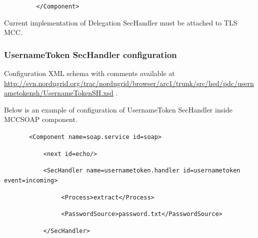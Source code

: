\documentclass{article}
\newcommand\textstyleInternetlink[1]{\textcolor[rgb]{0.0,0.0,0.5019608}{#1}}
\begin{document}
{\upshape\color{black}
\texttt{\ \ \ \ \ \ \ \ \ {\textless}/Component{\textgreater}}}

{\upshape\color{black}
Current implementation of Delegation\textbf{ }SecHandler must be
attached to TLS MCC. }

\subsubsection[UsernameToken SecHandler configuration]{UsernameToken
SecHandler configuration}
\label{bkm:RefSecuserametokenconfig}{\upshape\color{black}
Configuration XML schema with comments available at
\href{http://svn.nordugrid.org/trac/nordugrid/browser/arc1/trunk/src/hed/pdc/usernametokensh/UsernameTokenSH.xsd}{\textstyleInternetlink{http://svn.nordugrid.org/trac/nordugrid/browser/arc1/trunk/src/hed/pdc/usernametokensh/UsernameTo}}\href{http://svn.nordugrid.org/trac/nordugrid/browser/arc1/trunk/src/hed/pdc/usernametokensh/UsernameTokenSH.xsd}{\textstyleInternetlink{kenSH.xsd}}
.}

{\upshape\color{black}
Below is an example of configuration of UsernameToken SecHandler inside
MCCSOAP component.}

{\upshape\color{black}
\texttt{\ \ \ \ \ \ \ {\textless}Component
name={\textquotedbl}soap.service{\textquotedbl}
id={\textquotedbl}soap{\textquotedbl}{\textgreater}}}

{\upshape\color{black}
\texttt{\ \ \ \ \ \ \ \ \ \ \ {\textless}next
id={\textquotedbl}echo{\textquotedbl}/{\textgreater}}}

{\upshape\color{black}
\texttt{\ \ \ \ \ \ \ \ \ \ \ {\textless}SecHandler
name={\textquotedbl}usernametoken.handler{\textquotedbl}
id={\textquotedbl}usernametoken{\textquotedbl}
event={\textquotedbl}incoming{\textquotedbl}{\textgreater}}}

{\upshape\color{black}
\texttt{\ \ \ \ \ \ \ \ \ \ \ \ \ \ \ \ {\textless}Process{\textgreater}extract{\textless}/Process{\textgreater}}}

{\upshape\color{black}
\texttt{\ \ \ \ \ \ \ \ \ \ \ \ \ \ \ \ {\textless}PasswordSource{\textgreater}password.txt{\textless}/PasswordSource{\textgreater}}}

{\upshape\color{black}
\texttt{\ \ \ \ \ \ \ \ \ \ \ {\textless}/SecHandler{\textgreater}}}
\end{document}
